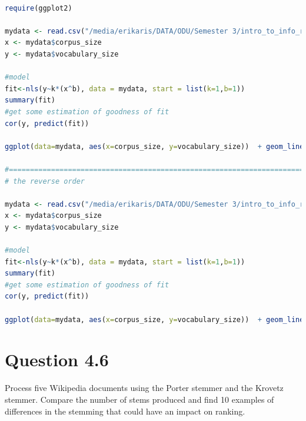 \documentclass[letterpaper,11pt]{article}
\begin{document}
\begin{lstlisting}[language=R, caption={Code for plotting vocabulary growth and calculating the Heap's parameter}, label={lst:heap-par}]

require(ggplot2)

mydata <- read.csv("/media/erikaris/DATA/ODU/Semester 3/intro_to_info_retrieval/assignments/a2/code_report/4_2-voc_corpus.csv", head=TRUE, sep = ',')
x <- mydata$corpus_size
y <- mydata$vocabulary_size

#model
fit<-nls(y~k*(x^b), data = mydata, start = list(k=1,b=1))
summary(fit)
#get some estimation of goodness of fit
cor(y, predict(fit))

ggplot(data=mydata, aes(x=corpus_size, y=vocabulary_size))  + geom_line(aes(group = 1), color="#000099") + geom_line(data=mydata, aes(x=corpus_size, y=predict(fit)), color="#CC0000") + labs(title='Vocabulary Growth',x = 'Corpus Size', y = 'Vocabulary Size') + scale_colour_manual(name='', values=c('Important line'='grey', 'Point values'='red'), guide='legend')

#=======================================================================
# the reverse order

mydata <- read.csv("/media/erikaris/DATA/ODU/Semester 3/intro_to_info_retrieval/assignments/a2/code_report/4_2-voc_corpus_reverse.csv", head=TRUE, sep = ',')
x <- mydata$corpus_size
y <- mydata$vocabulary_size

#model
fit<-nls(y~k*(x^b), data = mydata, start = list(k=1,b=1))
summary(fit)
#get some estimation of goodness of fit
cor(y, predict(fit))

ggplot(data=mydata, aes(x=corpus_size, y=vocabulary_size))  + geom_line(aes(group = 1), color="#000099") + geom_line(data=mydata, aes(x=corpus_size, y=predict(fit)), color="#CC0000") + labs(title='Vocabulary Growth',x = 'Corpus Size', y = 'Vocabulary Size') + scale_colour_manual(name='', values=c('Important line'='grey', 'Point values'='red'), guide='legend')

\end{lstlisting}

\noindent\makebox[\linewidth]{\rule{\textwidth}{0.4pt}}

\section*{Question 4.6}
\begin{spverbatim}
Process five Wikipedia documents using the Porter stemmer and the Krovetz stemmer. Compare the number of stems produced and find 10 examples of differences in the stemming that could have an impact on ranking.
\end{spverbatim}
\end{document}
